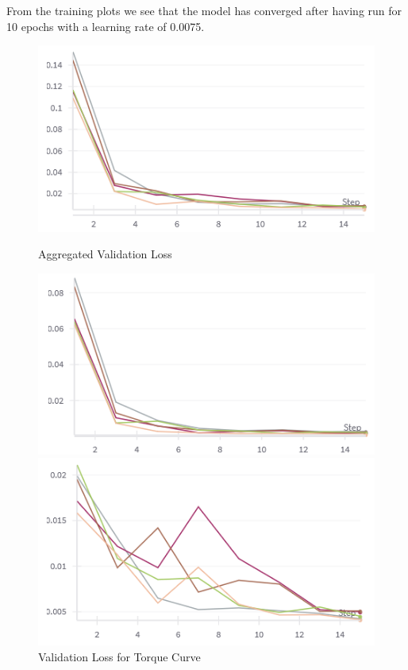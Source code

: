 \documentclass{report} %
\begin{document}
From the training plots we see that the model has converged after having run for 10 epochs with a learning rate of 0.0075.

\begin{figure}[H]
    \centering
    \begin{minipage}[b]{0.3\textwidth}
        \includegraphics[width=\textwidth]{./ReportImages/val_loss.png}
        \caption{\centering Aggregated Validation Loss}
        \label{fig:Aggregated Validation Loss}
    \end{minipage}
    \begin{minipage}[b]{0.3\textwidth}
        \includegraphics[width=\textwidth]{./ReportImages/val_loss_y1.png}
        \caption{\centering Validation Loss for Torque Curve}
        \label{fig:Validation Loss for Torque Curve}
    \end{minipage}
    \hfill
    \begin{minipage}[b]{0.3\textwidth}
        \includegraphics[width=\textwidth]{./ReportImages/val_loss_y2.png}

\end{minipage}
\end{figure}
\end{document}
